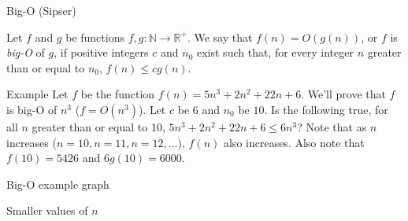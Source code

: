 \begin{frame}{Big-O (Sipser)}
  \begin{definition}
    Let $f$ and $g$ be functions $f,g: \mathbb{N} \rightarrow \mathbb{R}^+$.
    We say that $f(n) = O(g(n))$, or $f$ is \emph{big-O} of $g$, if positive integers $c$ and $n_0$ exist such that, for every integer $n$ greater than or equal to $n_0$, $f(n) \le cg(n)$.
  \end{definition}
  \begin{alertblock}{Example}
    Let $f$ be the function $f(n) = 5n^3 + 2n^2 + 22n + 6$.
    We'll prove that $f$ is big-O of $n^3$ ($f = O(n^3)$).
    Let $c$ be $6$ and $n_0$ be $10$.
    Is the following true, for all $n$ greater than or equal to 10, $5n^3 + 2n^2 + 22n + 6 \le 6n^3$?
    Note that as $n$ increases ($n=10,n=11,n=12,\ldots$), $f(n)$ also increases.
    Also note that $f(10) = 5426$ and $6g(10) = 6000$.
  \end{alertblock}
\end{frame}


\begin{frame}[fragile]{Big-O example graph}
\begin{center}
\end{center}
\end{frame}

\begin{frame}[fragile]{Smaller values of $n$}
\begin{center}
\end{center}
\end{frame}

